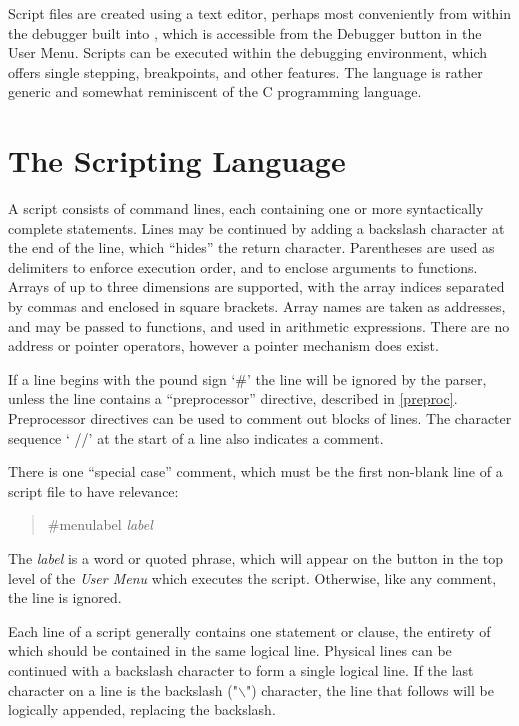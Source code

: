 Script files are created using a text editor, perhaps most
conveniently from within the debugger built into {\Xic}, which is
accessible from the {\cb Debugger} button in the {\cb User Menu}. 
Scripts can be executed within the debugging environment, which offers
single stepping, breakpoints, and other features.  The language is
rather generic and somewhat reminiscent of the C programming language.

\section{The Scripting Language}

A script consists of command lines, each containing one or more
syntactically complete statements.  Lines may be continued by adding a
backslash character at the end of the line, which ``hides'' the return
character.  Parentheses are used as delimiters to enforce execution
order, and to enclose arguments to functions.  Arrays of up to three
dimensions are supported, with the array indices separated by commas
and enclosed in square brackets.  Array names are taken as addresses,
and may be passed to functions, and used in arithmetic expressions. 
There are no address or pointer operators, however a pointer mechanism
does exist.

If a line begins with the pound sign `{\vt \#}' the line will be
ignored by the parser, unless the line contains a ``preprocessor''
directive, described in \ref{preproc}.  Preprocessor directives can be
used to comment out blocks of lines.  The character sequence `{\vt
//}' at the start of a line also indicates a comment.

There is one ``special case'' comment, which must be the first
non-blank line of a script file to have relevance:

\begin{quote}
{\vt \#menulabel} {\it label}
\end{quote}

The {\it label} is a word or quoted phrase, which will appear on the
button in the top level of the {\it User Menu} which executes the
script.  Otherwise, like any comment, the line is ignored.

Each line of a script generally contains one statement or clause, the
entirety of which should be contained in the same logical line. 
Physical lines can be continued with a backslash character to form a
single logical line.  If the last character on a line is the backslash
({\vt "{$\backslash$}"}) character, the line that follows will be
logically appended, replacing the backslash.

